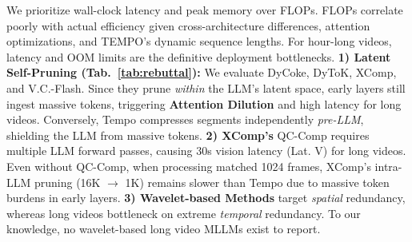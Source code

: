 \vspace{-0.2em}
We prioritize wall-clock latency and peak memory over FLOPs. FLOPs correlate poorly with actual efficiency given cross-architecture differences, attention optimizations, and TEMPO's dynamic sequence lengths. For hour-long videos, latency and OOM limits are the definitive deployment bottlenecks.
\textbf{1) Latent Self-Pruning (Tab.~\ref{tab:rebuttal}):} We evaluate DyCoke, DyToK, XComp, and V.C.-Flash. Since they prune \textit{within} the LLM's latent space, early layers still ingest massive tokens, triggering \textbf{Attention Dilution} and high latency for long videos. Conversely, Tempo compresses segments independently \textit{pre-LLM}, shielding the LLM from massive tokens.
%
\textbf{2) XComp's} QC-Comp requires multiple LLM forward passes, causing 30s vision latency (Lat. V) for long videos. Even without QC-Comp, when processing matched 1024 frames, XComp's intra-LLM pruning (16K $\rightarrow$ 1K) remains slower than Tempo due to massive token burdens in early layers.
%
\textbf{3) Wavelet-based Methods} target \textit{spatial} redundancy, whereas long videos bottleneck on extreme \textit{temporal} redundancy. To our knowledge, no wavelet-based long video MLLMs exist to report.


